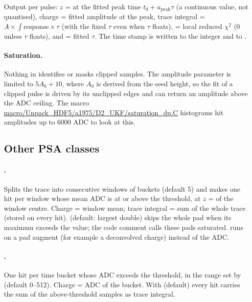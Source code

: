 Output per pulse: $z$ =  at the fitted peak time $t_0 + u_\mathrm{peak}\tau$ (a
continuous value, not quantised), charge = fitted amplitude at the peak, trace integral = $A\times
\int\!\mathrm{response}\times\tau$ (with the fixed $\tau$ even when $\tau$ floats),
 = local reduced $\chi^2$ (0 unless $\tau$ floats), and
 = fitted $\tau$. The time stamp is written to the integer
 and to .

\paragraph{Saturation.} Nothing in  identifies or masks clipped samples. The
amplitude parameter is limited to $5A_0+10$, where $A_0$ is derived from the seed height, so the
fit of a clipped pulse is driven by its unclipped edges and can return an amplitude above the ADC
ceiling. The macro \url{macro/Unpack_HDF5/a1975/D2_UKF/saturation_dp.C} histograms hit amplitudes
up to 6000 ADC to look at this.

\subsection{Other PSA classes}

\paragraph{.} Splits the trace into consecutive windows of 
buckets (default 5) and makes one hit per window whose mean ADC is at or above the threshold, at
$z$ =  of the window centre. Charge = window mean; trace integral = sum of the
whole trace (stored on every hit).  (default: largest double) skips the
whole pad when its maximum exceeds the value; the code comment calls these pads saturated.
 runs on a pad augment (for example a deconvolved charge) instead of
the ADC.

\paragraph{.} One hit per time bucket whose ADC exceeds the threshold, in the
range set by  (default 0--512). Charge = ADC of the bucket. With
 (default) every hit carries the sum of the above-threshold
samples as trace integral.


